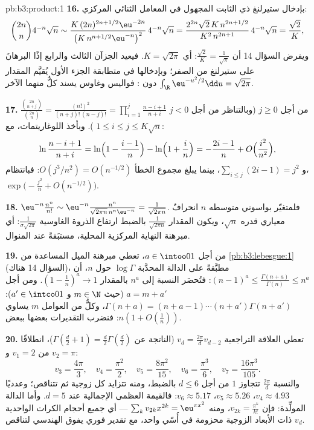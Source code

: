 \begin{solution}{pb:b3:product:1}
\textbf{16.} بإدخال ستيرلنغ ذي الثابت المجهول في المعامل
الثنائي المركزي:
\[
\binom{2n}n4^{-n}\sqrt n \sim
\frac{K\,(2n)^{2n+1/2}\eu^{-2n}}{\bigl(K\,n^{n+1/2}
\eu^{-n}\bigr)^2}\,4^{-n}\sqrt n
= \frac{2^{2n}\sqrt{2}\,K\,n^{2n+1/2}}{K^2\,n^{2n+1}}
\,4^{-n}\sqrt n = \frac{\sqrt2}{K},
\]
ويفرض السؤال 14 أن $\frac{\sqrt2}K = \frac1{\sqrt\pi}$:
أي $K = \sqrt{2\pi}$. فيعيد الجزآن الثالث والرابع إذًا البرهانَ على
ستيرلنغ من الصفر؛ وبإدخالها في متطابقة الجزء الأول يُقيَّم
المقدار $\int_\R\eu^{-u^2/2}\dd u = \sqrt{2\pi}$ دون : فواليس وغاوس يسند كلٌّ منهما الآخر.

\textbf{17.} $\frac{\binom{2n}{n+j}}{\binom{2n}n} =
\frac{(n!)^2}{(n+j)!\,(n-j)!} =
\prod_{i=1}^{j}\frac{n-i+1}{n+i}$ من أجل $j \geq 0$ (وبالتناظر من أجل
$j < 0$). وبأخذ اللوغاريتمات، مع $1 \leq i
\leq j \leq K\sqrt n$:
\[
\ln\frac{n-i+1}{n+i} = \ln\Bigl(1 - \frac{i-1}n\Bigr) -
\ln\Bigl(1 + \frac in\Bigr) = -\frac{2i-1}{n} +
O\Bigl(\frac{i^2}{n^2}\Bigr),
\]
و $\sum_{i\leq j}(2i - 1) = j^2$، بينما يبلغ مجموع الخطأ
$O(j^3/n^2) = O(n^{-1/2})$: فبانتظام،
$\exp\bigl(-\frac{j^2}n + O(n^{-1/2})\bigr)$.

\textbf{18.} $\eu^{-n}\frac{n^n}{n!} \sim \eu^{-n}
\frac{n^n}{\sqrt{2\pi n}\,n^n\eu^{-n}} =
\frac1{\sqrt{2\pi n}}$. فلمتغيّر بواسوني متوسطه $n$ انحرافٌ
معياري قدره $\sqrt n$، ويكون المقدار $\frac1{\sqrt{2\pi n}}$ بالضبط ارتفاع
الذروة الغاوسية $\frac1{\sigma\sqrt{2\pi}}$:
أي مبرهنة النهاية المركزية المحلية، مستبَقةً عند المنوال.

\textbf{19.} من أجل $a \in \intoo01$، تعطي مبرهنة الميل
المساعدة من \cref{pb:b3:lebesgue:1} (السؤال 14 هناك)، مطبَّقةً على الدالة
المحدَّبة $\log\Gamma$ حول $n$، أن $(n-1)^a \leq
\frac{\Gamma(n+a)}{\Gamma(n)} \leq n^a$: فتُحصَر النسبة إلى
$n^a$ بالمقدار $(1 - \frac1n)^a \to 1$. ومن أجل $a = m + a'$
(حيث $m \in \N$ و $a' \in \intco01$): $\Gamma(n+a) = (n + a - 1)
\cdots(n + a')\Gamma(n + a')$، وكلٌّ من العوامل $m$
يساوي $n(1 + O(\frac1n))$: فنضرب التقديرات بعضها ببعض.

\textbf{20.} تعطي العلاقة التراجعية $v_d = \frac{2\pi}dv_{d-2}$
(الناتجة عن $\Gamma(\frac d2 + 1) = \frac d2\Gamma(\frac d2)$)،
انطلاقًا من $v_1 = 2$ و $v_2 = \pi$:
\[
v_3 = \frac{4\pi}3,\quad v_4 = \frac{\pi^2}2,\quad
v_5 = \frac{8\pi^2}{15},\quad v_6 = \frac{\pi^3}6,\quad
v_7 = \frac{16\pi^3}{105}.
\]
والنسبة $\frac{2\pi}d$ تتجاوز $1$ من أجل $d \leq 6$ بالضبط،
ومنه تتزايد كل زوجية ثم تتناقص؛ وعدديًا $v_4
\approx 4.93$، $v_5 \approx 5.26$،
$v_6 \approx 5.17$: فالقيمة العظمى الإجمالية عند $d = 5$. وأما الدالة
المولِّدة: فإن $v_{2k} =
\frac{\pi^k}{k!}$، ومنه $\sum_kv_{2k}x^{2k} =
\eu^{\pi x^2}$ --- أي جميع أحجام الكرات
الواحدية ذات الأبعاد الزوجية محزومة في أُسّي واحد، مع تقدير
فوري يفوق الهندسي لتناقص $v_d$.


\end{solution}
